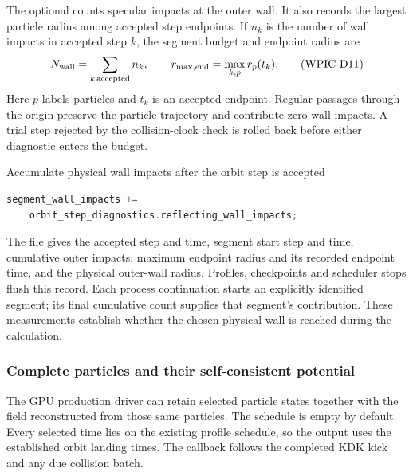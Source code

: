 The optional  counts specular impacts at the
outer wall. It also records the largest particle radius among accepted
step endpoints. If \(n_k\) is the number of wall impacts in accepted step
\(k\), the segment budget and endpoint radius are
\[
 N_{\rm wall}=\sum_{k\,\rm accepted}n_k,\qquad
 r_{\rm max,end}=\max_{k,p}r_p(t_k).                 \tag{WPIC-D11}
\]
Here \(p\) labels particles and \(t_k\) is an accepted endpoint. Regular
passages through the origin preserve the particle trajectory and contribute
zero wall impacts. A trial step rejected by the collision-clock check is
rolled back before either diagnostic enters the budget.

{}
{Accumulate physical wall impacts after the orbit step is accepted}
\begin{lstlisting}[language=C++]
segment_wall_impacts +=
    orbit_step_diagnostics.reflecting_wall_impacts;
\end{lstlisting}
The file  gives the accepted step and time,
segment start step and time, cumulative outer impacts, maximum endpoint
radius and its recorded endpoint time, and the physical outer-wall radius.
Profiles, checkpoints and scheduler stops flush this record. Each process
continuation starts an explicitly identified segment; its final cumulative
count supplies that segment's contribution. These measurements establish
whether the chosen physical wall is reached during the calculation.

\subsubsection{Complete particles and their self-consistent potential}

The GPU production driver can retain selected particle states together with
the field reconstructed from those same particles. The schedule is empty by
default. Every selected time lies on the existing profile schedule, so the
output uses the established orbit landing times. The callback follows the
completed KDK kick and any due collision batch.

